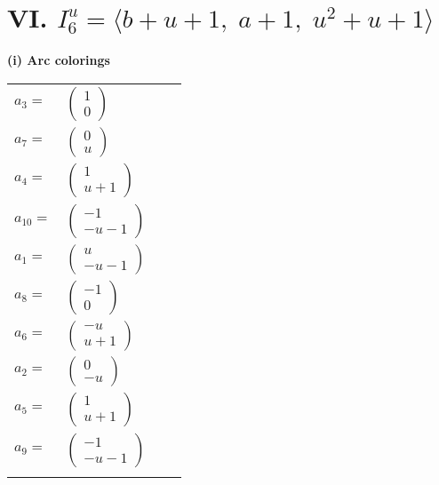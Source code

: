 \documentclass[1p]{elsarticle_modified}
\theoremstyle{definition}
\begin{document}
\centering \section*{VI. $I^u_{6}= \langle b+u+1,\;a+1,\;u^2+u+1 \rangle$}
\flushleft \textbf{(i) Arc colorings}\\
\begin{tabular}{m{7pt} m{180pt} m{7pt} m{180pt} }
\flushright $a_{3}=$&$\begin{pmatrix}1\\0\end{pmatrix}$ \\
\flushright $a_{7}=$&$\begin{pmatrix}0\\u\end{pmatrix}$ \\
\flushright $a_{4}=$&$\begin{pmatrix}1\\u+1\end{pmatrix}$ \\
\flushright $a_{10}=$&$\begin{pmatrix}-1\\- u-1\end{pmatrix}$ \\
\flushright $a_{1}=$&$\begin{pmatrix}u\\- u-1\end{pmatrix}$ \\
\flushright $a_{8}=$&$\begin{pmatrix}-1\\0\end{pmatrix}$ \\
\flushright $a_{6}=$&$\begin{pmatrix}- u\\u+1\end{pmatrix}$ \\
\flushright $a_{2}=$&$\begin{pmatrix}0\\- u\end{pmatrix}$ \\
\flushright $a_{5}=$&$\begin{pmatrix}1\\u+1\end{pmatrix}$ \\
\flushright $a_{9}=$&$\begin{pmatrix}-1\\- u-1\end{pmatrix}$\\&\end{tabular}
\end{document}
